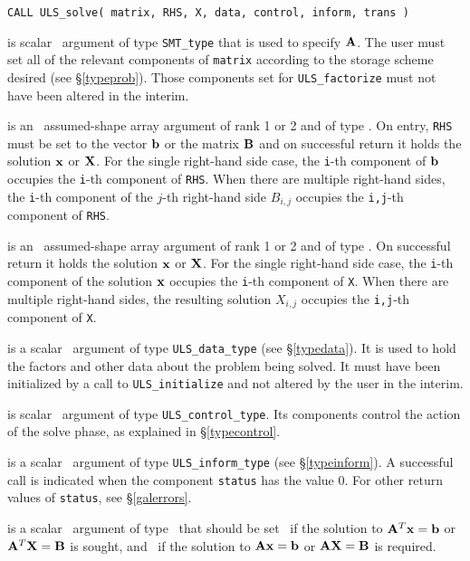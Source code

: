 \documentclass{galahad}
\newcommand{\packagename}{ULS}
\begin{document}
\hskip0.5in 
{\tt CALL \packagename\_solve( matrix, RHS, X, data, control, inform, trans )}

\begin{description}

 is scalar \intentin\ argument of type {\tt SMT\_type}  
that is used to specify ${\mathbf{A}}$.
The user must set all of the relevant components of {\tt matrix} according
to the storage scheme desired (see \S\ref{typeprob}). Those components
set for {\tt \packagename\_factorize} must not have been altered in the interim.

 is an \intentin\ assumed-shape array argument of rank 1 or 2
and of type \realdp.  On entry, {\tt RHS} must be set 
to the vector ${\mathbf{b}}$ or the matrix ${\mathbf{B}}$ and on successful return it holds 
the solution ${\mathbf{x}}$ or ${\mathbf{X}}$. For the single right-hand side case, the
{\tt i}-th component of ${\mathbf{b}}$
occupies the {\tt i}-th component of {\tt RHS}. When there are multiple
right-hand sides, the {\tt i}-th component of the $j$-th right-hand side $B_{i,j}$ 
occupies the {\tt i,j}-th component of {\tt RHS}. 
 
 is an \intentinout\ assumed-shape array argument of rank 1 or 2
and of type \realdp.  On successful return it holds 
the solution ${\mathbf{x}}$ or ${\mathbf{X}}$. For the single right-hand side case, the
{\tt i}-th component of the solution ${\mathbf{x}}$
occupies the {\tt i}-th component of {\tt X}. When there are multiple
right-hand sides, the resulting solution $X_{i,j}$ occupies the 
{\tt i,j}-th component of {\tt X}. 
 
 is a scalar \intentinout\ argument of type 
{\tt \packagename\_data\_type}
(see \S\ref{typedata}). It is used to hold the factors and other 
data about the problem being solved. 
It must have been initialized by a call to
{\tt \packagename\_ini\-tialize} and not altered by the user in the interim.

 is scalar \intentin\ argument of type 
{\tt \packagename\_control\_type}. Its components control the action
of the solve phase, as explained in 
\S\ref{typecontrol}. 
 
 is a scalar \intentinout\ argument of type 
{\tt \packagename\_inform\_type}
(see \S\ref{typeinform}). 
A successful call is indicated when the  component {\tt status} has the value 0. 
For other return values of {\tt status}, see \S\ref{galerrors}.

 is a scalar \intentin\ argument of type \logical\ that should be
set \true\ if the solution to ${\mathbf{A}}^T {\mathbf{x}} = {\mathbf{b}}$ or ${\mathbf{A}}^T {\mathbf{X}} = {\mathbf{B}}$ 
is sought, and \false\ if the solution to ${\mathbf{A}} {\mathbf{x}} = {\mathbf{b}}$ or 
${\mathbf{A}} {\mathbf{X}} = {\mathbf{B}}$ is required.

\end{description}
\end{document}
